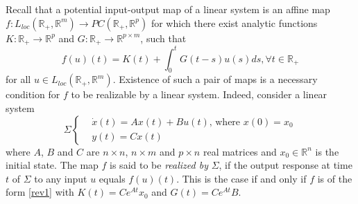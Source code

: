 \documentclass[journal]{IEEEtran}
\begin{document}
Recall that a potential input-output map of a linear system is an affine map $f: L_{loc}(\mathbb{R}_+,\mathbb{R}^m) \rightarrow PC(\mathbb{R}_+,\mathbb{R}^p)$ for which there exist analytic functions $K:\mathbb{R}_{+} \rightarrow \mathbb{R}^{p}$ and $G:\mathbb{R}_{+} \rightarrow \mathbb{R}^{p \times m}$, such that
\begin{equation}
	\label{rev1} 
	f(u)(t)=K(t)+\int_{0}^{t} G(t-s)u(s)ds, \forall t \in \mathbb{R}_{+}
\end{equation}
for all $u \in  L_{loc}(\mathbb{R}_+,\mathbb{R}^m)$. Existence of such a pair of maps is a necessary condition for $f$ to be realizable by a linear system. Indeed, consider a linear system
\begin{equation}
	\label{rev2}
	\Sigma\left\{
	\begin{split}
		& \dot x(t) = Ax(t)+Bu(t) \mbox{, where } x(0)=x_0 \\
		& y(t)=Cx(t)
	\end{split}\right.
\end{equation}
where $A$, $B$ and $C$ are $n \times n$, $n \times m$ and $p \times n$ real matrices and $x_0 \in \mathbb{R}^n$ is the initial state. The map $f$ is said to be \emph{realized by} $\Sigma$, if the output response at time $t$ of $\Sigma$ to any input $u$ equals $f(u)(t)$. This is the case if and only if $f$ is of the form \eqref{rev1} with $K(t)=Ce^{At}x_0$ and $G(t)=Ce^{At}B$.
\end{document}
